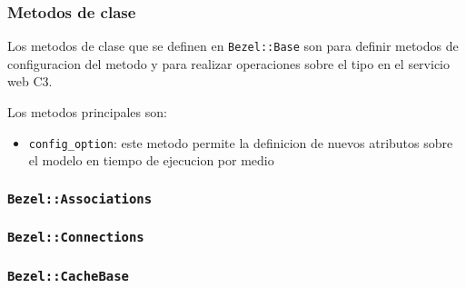 % 

\subsubsection{Metodos de clase}

Los metodos de clase que se definen en \texttt{Bezel::Base} son para
definir metodos de configuracion del metodo y para realizar operaciones
sobre el tipo en el servicio web C3.

Los metodos principales son:
\begin{itemize}
  \item \texttt{config\_option}: este metodo permite la definicion
  de nuevos atributos sobre el modelo en tiempo de ejecucion por
  medio 
\end{itemize}





\subsubsection{\texttt{Bezel::Associations}}



\subsubsection{\texttt{Bezel::Connections}}



\subsubsection{\texttt{Bezel::CacheBase}}


